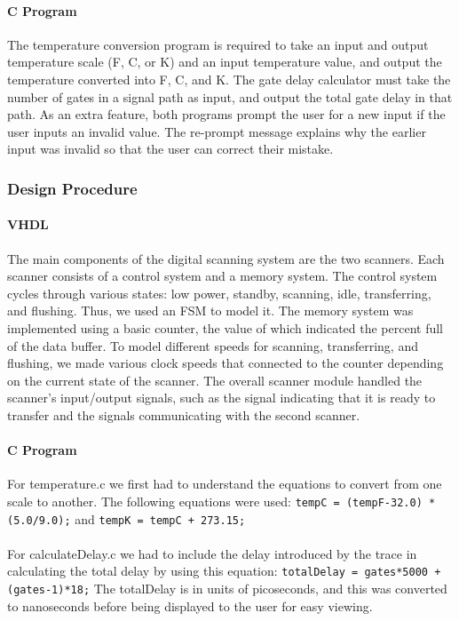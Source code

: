 \documentclass{article}
\begin{document}
  \paragraph{C Program} The temperature conversion program is required to take an input and output temperature scale (F, C, or K) and an input temperature value, and output the temperature converted into F, C, and K. The gate delay calculator must take the number of gates in a signal path as input, and output the total gate delay in that path. As an extra feature, both programs prompt the user for a new input if the user inputs an invalid value. The re-prompt message explains why the earlier input was invalid so that the user can correct their mistake.

  
  \subsubsection{Design Procedure}
  \paragraph{VHDL} The main components of the digital scanning system are the two scanners. Each scanner consists of a control system and a memory system. The control system cycles through various states: low power, standby, scanning, idle, transferring, and flushing. Thus, we used an FSM to model it. The memory system was implemented using a basic counter, the value of which indicated the percent full of the data buffer. To model different speeds for scanning, transferring, and flushing, we made various clock speeds that connected to the counter depending on the current state of the scanner. The overall scanner module handled the scanner’s input/output signals, such as the signal indicating that it is ready to transfer and the signals communicating with the second scanner.

  \paragraph{C Program} For temperature.c we first had to understand the equations to convert from one scale to another. The following equations were used:
    \lstinline{tempC = (tempF-32.0) * (5.0/9.0);} and \lstinline{tempK = tempC + 273.15;}

  \paragraph{} For calculateDelay.c we had to include the delay introduced by the trace in calculating the total delay by using this equation:
    \lstinline{totalDelay = gates*5000 + (gates-1)*18;}
  The totalDelay is in units of picoseconds, and this was converted to nanoseconds before being displayed to the user for easy viewing. 
\end{document}
